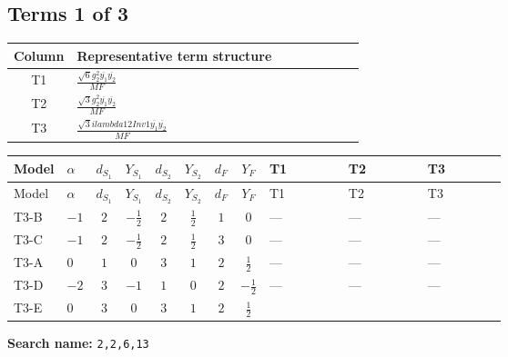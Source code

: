 \documentclass[8pt]{article}
\begin{document}
\begin{landscape}
\subsection*{Terms 1 of 3}
\begin{center}
\begin{tabular}{@{}c >{\raggedright\arraybackslash}p{0.82\linewidth}@{}}
\toprule
Column & Representative term structure \\
\midrule
T1 & \(\displaystyle \frac{\sqrt{6} g_{2}^{2} \overline{y_{1}} \overline{y_{2}}}{MF}\) \\
\midrule
T2 & \(\displaystyle \frac{\sqrt{3} g_{2}^{2} \overline{y_{1}} \overline{y_{2}}}{MF}\) \\
\midrule
T3 & \(\displaystyle \frac{\sqrt{3} i lambda12Inv1 \overline{y_{1}} \overline{y_{2}}}{MF}\) \\
\midrule
\bottomrule
\end{tabular}
\end{center}
\smallskip
\tiny
\begin{longtable}{@{}llcccccc >{\raggedright\arraybackslash}p{0.21\linewidth} >{\raggedright\arraybackslash}p{0.21\linewidth} >{\raggedright\arraybackslash}p{0.21\linewidth}@{}}
\toprule
Model & $\alpha$ & $d_{S_1}$ & $Y_{S_1}$ & $d_{S_2}$ & $Y_{S_2}$ & $d_F$ & $Y_F$ & T1 & T2 & T3 \\
\midrule
\endfirsthead
\toprule
Model & $\alpha$ & $d_{S_1}$ & $Y_{S_1}$ & $d_{S_2}$ & $Y_{S_2}$ & $d_F$ & $Y_F$ & T1 & T2 & T3 \\
\midrule
\endhead
T3-B & $-1$ & $2$ & $-\frac{1}{2}$ & $2$ & $\frac{1}{2}$ & $1$ & $0$ & --- & --- & --- \\
\midrule
T3-C & $-1$ & $2$ & $-\frac{1}{2}$ & $2$ & $\frac{1}{2}$ & $3$ & $0$ & --- & --- & --- \\
\midrule
T3-A & $0$ & $1$ & $0$ & $3$ & $1$ & $2$ & $\frac{1}{2}$ & --- & --- & --- \\
\midrule
T3-D & $-2$ & $3$ & $-1$ & $1$ & $0$ & $2$ & $-\frac{1}{2}$ & --- & --- & --- \\
\midrule
T3-E & $0$ & $3$ & $0$ & $3$ & $1$ & $2$ & $\frac{1}{2}$ & \scriptsize\adjustbox{max width=\linewidth}{$\begin{gathered} \frac{\sqrt{6} g_{2}^{2} \overline{y_{1}} \overline{y_{2}}}{3 MF}\end{gathered}$} & \scriptsize\adjustbox{max width=\linewidth}{$\begin{gathered} \frac{\sqrt{3} g_{2}^{2} \overline{y_{1}} \overline{y_{2}}}{6 MF}\end{gathered}$} & \scriptsize\adjustbox{max width=\linewidth}{$\begin{gathered} - \frac{\sqrt{3} i lambda12Inv1 \overline{y_{1}} \overline{y_{2}}}{6 MF}\end{gathered}$} \\
\midrule
\bottomrule
\end{longtable}
\clearpage
\noindent\textbf{Search name: }\texttt{2,2,6,13}\par\smallskip

\end{landscape}
\end{document}
